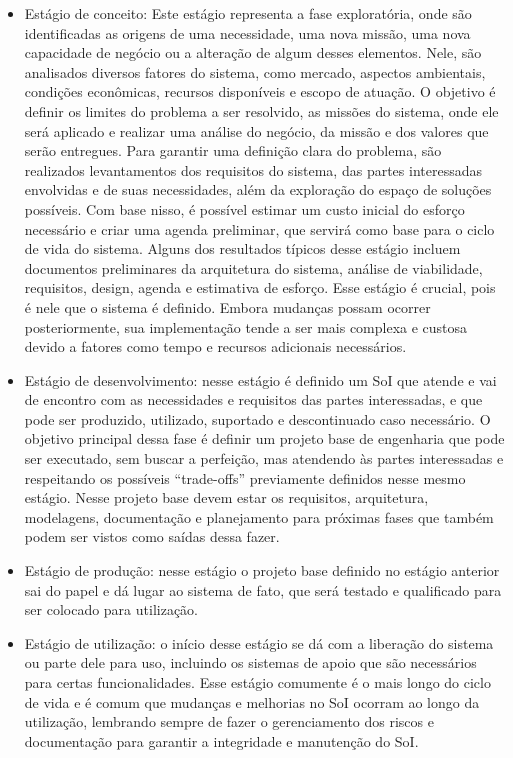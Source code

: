 	\begin{itemize}
		\item Estágio de conceito: Este estágio representa a fase exploratória, onde são identificadas as origens de uma necessidade, uma nova missão, uma nova capacidade de negócio ou a alteração de algum desses elementos. Nele, são analisados diversos fatores do sistema, como mercado, aspectos ambientais, condições econômicas, recursos disponíveis e escopo de atuação. O objetivo é definir os limites do problema a ser resolvido, as missões do sistema, onde ele será aplicado e realizar uma análise do negócio, da missão e dos valores que serão entregues. Para garantir uma definição clara do problema, são realizados levantamentos dos requisitos do sistema, das partes interessadas envolvidas e de suas necessidades, além da exploração do espaço de soluções possíveis. Com base nisso, é possível estimar um custo inicial do esforço necessário e criar uma agenda preliminar, que servirá como base para o ciclo de vida do sistema. Alguns dos resultados típicos desse estágio incluem documentos preliminares da arquitetura do sistema, análise de viabilidade, requisitos, design, agenda e estimativa de esforço. Esse estágio é crucial, pois é nele que o sistema é definido. Embora mudanças possam ocorrer posteriormente, sua implementação tende a ser mais complexa e custosa devido a fatores como tempo e recursos adicionais necessários.
		\item Estágio de desenvolvimento: nesse estágio é definido um SoI que atende e vai de encontro com as necessidades e requisitos das partes interessadas, e que pode ser produzido, utilizado, suportado e descontinuado caso necessário. O objetivo principal dessa fase é definir um projeto base de engenharia que pode ser executado, sem buscar a perfeição, mas atendendo às partes interessadas e respeitando os possíveis ``trade-offs'' previamente definidos nesse mesmo estágio. Nesse projeto base devem estar os requisitos, arquitetura, modelagens, documentação e planejamento para próximas fases que também podem ser vistos como saídas dessa fazer.
		\item Estágio de produção: nesse estágio o projeto base definido no estágio anterior sai do papel e dá lugar ao sistema de fato, que será testado e qualificado para ser colocado para utilização.
		\item Estágio de utilização: o início desse estágio se dá com a liberação do sistema ou parte dele para uso, incluindo os sistemas de apoio que são necessários para certas funcionalidades. Esse estágio comumente é o mais longo do ciclo de vida e é comum que mudanças e melhorias no SoI ocorram ao longo da utilização, lembrando sempre de fazer o gerenciamento dos riscos e documentação para garantir a integridade e manutenção do SoI.

\end{itemize}
